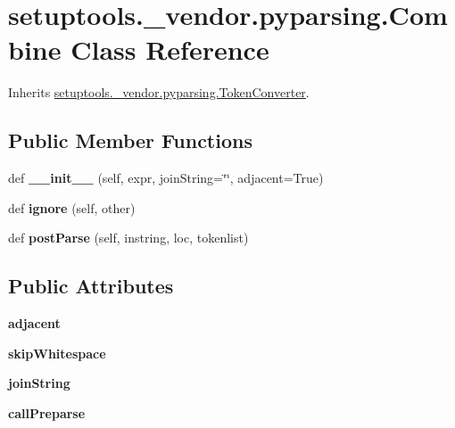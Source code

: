 \hypertarget{classsetuptools_1_1__vendor_1_1pyparsing_1_1_combine}{}\section{setuptools.\+\_\+vendor.\+pyparsing.\+Combine Class Reference}
\label{classsetuptools_1_1__vendor_1_1pyparsing_1_1_combine}


Inherits \hyperlink{classsetuptools_1_1__vendor_1_1pyparsing_1_1_token_converter}{setuptools.\+\_\+vendor.\+pyparsing.\+Token\+Converter}.

\subsection*{Public Member Functions}
\begin{DoxyCompactItemize}
\item 
\mbox{\label{classsetuptools_1_1__vendor_1_1pyparsing_1_1_combine_a6bc0f189d26a4ac6a5986cafb15641b5}} 
def {\bfseries \+\_\+\+\_\+init\+\_\+\+\_\+} (self, expr, join\+String=\char`\"{}\char`\"{}, adjacent=True)
\item 
\mbox{\label{classsetuptools_1_1__vendor_1_1pyparsing_1_1_combine_a84cbd8b1c653fb08b5a77fc26b83b005}} 
def {\bfseries ignore} (self, other)
\item 
\mbox{\label{classsetuptools_1_1__vendor_1_1pyparsing_1_1_combine_af1a6aa53e409c35e5c28c8ccb9fc62d7}} 
def {\bfseries post\+Parse} (self, instring, loc, tokenlist)
\end{DoxyCompactItemize}
\subsection*{Public Attributes}
\begin{DoxyCompactItemize}
\item 
\mbox{\label{classsetuptools_1_1__vendor_1_1pyparsing_1_1_combine_af72a8e1f083c2a312c268bf1e49e0d7a}} 
{\bfseries adjacent}
\item 
\mbox{\label{classsetuptools_1_1__vendor_1_1pyparsing_1_1_combine_ad6d43d8440c852d1df965a59192a2c31}} 
{\bfseries skip\+Whitespace}
\item 
\mbox{\label{classsetuptools_1_1__vendor_1_1pyparsing_1_1_combine_acf8657472adde6974dc62fd9f34a337a}} 
{\bfseries join\+String}
\item 
\mbox{\label{classsetuptools_1_1__vendor_1_1pyparsing_1_1_combine_a43693d7a37e335c02b6f0e82e33ad4de}} 
{\bfseries call\+Preparse}
\end{DoxyCompactItemize}
